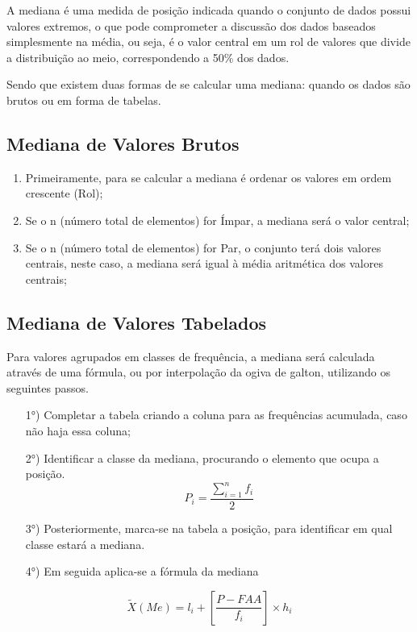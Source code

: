 A mediana é uma medida de posição indicada quando o conjunto de dados possui valores extremos,
o que pode comprometer a discussão dos dados baseados simplesmente na média, ou seja, é o
valor central em um rol de valores que divide a distribuição ao meio, correspondendo a 50\% dos dados.\vskip0.3cm

Sendo que existem duas formas de se calcular uma mediana: quando os dados são brutos ou em forma de tabelas.\vskip0.3cm


\subsection{Mediana de Valores Brutos}


\begin{enumerate}
  \item Primeiramente, para se calcular a mediana é ordenar os valores em ordem crescente (Rol);
  \item Se o n (número total de elementos) for Ímpar, a mediana será o valor central;
  \item Se o n (número total de elementos) for Par, o conjunto terá dois valores centrais, neste caso, a mediana será igual à média aritmética dos valores centrais;
\end{enumerate}

\subsection{Mediana de Valores Tabelados}


Para valores agrupados em classes de frequência, a mediana será calculada através de uma fórmula, ou por interpolação da ogiva de galton, utilizando os seguintes passos.



\begin{enumerate}
\item [{1°)}] Completar a tabela criando a coluna para as frequências acumulada, caso não haja essa coluna;
\item [{2°)}]Identificar a classe da mediana, procurando o elemento que ocupa a posição.
$$ P_{i}=\frac{\sum_{i=1}^{n}f_{i}}{2}$$
\item [{3°)}] Posteriormente, marca-se na tabela a posição, para identificar em qual classe estará a mediana.
\item [{4°)}] Em seguida aplica-se a fórmula da mediana
\end{enumerate}

\begin{equation}\label{}
    \tilde{X}(Me)=l_{i}+\left[\frac{P-FAA}{f_{i}}\right]\times h_{i}
\end{equation}

